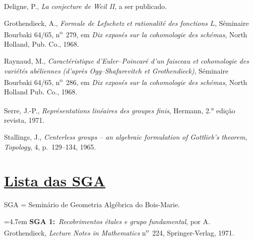 \clearpage
{}
\setcounter{page}{8}

\begin{enumerate}[label={\textup{[\arabic*]}},leftmargin=3.2em,labelsep=1em,itemsep=1.1em,parsep=0pt,topsep=0pt]
\item Deligne, P., \emph{La conjecture de Weil II}, a ser publicado.

\item Grothendieck, A., \emph{Formule de Lefschetz et rationalit\'e des fonctions $L$}, S\'eminaire Bourbaki 64/65, n\textsuperscript{o}~279, em \emph{Dix expos\'es sur la cohomologie des sch\'emas}, North Holland, Pub. Co., 1968.

\item Raynaud, M., \emph{Caract\'eristique d'Euler--Poincar\'e d'un faisceau et cohomologie des vari\'et\'es ab\'eliennes (d'apr\`es Ogg--Shafarevitch et Grothendieck)}, S\'eminaire Bourbaki 64/65, n\textsuperscript{o}~286, em \emph{Dix expos\'es sur la cohomologie des sch\'emas}, North Holland Pub. Co., 1968.

\item Serre, J.-P., \emph{Repr\'esentations lin\'eaires des groupes finis}, Hermann, 2.\textsuperscript{a} edição revista, 1971.

\item Stallings, J., \emph{Centerless groups -- an algebraic formulation of Gottlieb's theorem}, \emph{Topology}, 4, p.~129--134, 1965.
\end{enumerate}

\clearpage
\section*{\uline{Lista das SGA}}

\noindent SGA = Seminário de Geometria Algébrica do Bois-Marie.

\begingroup
\newcommand{\sgalistentry}[2]{%
  \par\medskip\noindent
  \hangindent=4.7em
  \textbf{#1:}\ #2\par}
\sgalistentry{SGA 1}{\emph{Recobrimentos étales e grupo fundamental}, por A. Grothendieck, \emph{Lecture Notes in Mathematics} n\textsuperscript{o}~224, Springer-Verlag, 1971.}

